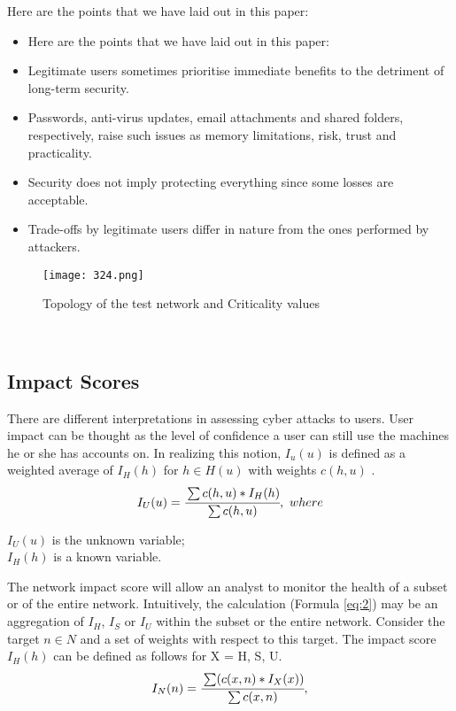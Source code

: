 \documentclass{ledger}
\begin{document}
Here are the points that we have laid out in this paper:
\begin{itemize}
    \item Here are the points that we have laid out in this paper:
    \item Legitimate users sometimes prioritise immediate benefits to the detriment of long-term security. 
    \item Passwords, anti-virus updates, email attachments and shared folders, respectively, raise such issues as memory limitations, risk, trust and practicality. 
    \item Security does not imply protecting everything since some losses are acceptable.  
    \item Trade-offs by legitimate users differ in nature from the ones performed by attackers. 
\end{itemize}
    


\begin{figure}[H]
    \centering
    \texttt{[image: 324.png]}
    \caption{Topology of the test network and Criticality values}
    \label{fig2:enter-label}
\end{figure}
\


\subsection{Impact Scores}
There are different interpretations in assessing cyber attacks to users. User impact can be thought as the level of confidence a user can still use the machines he or she has accounts on. In realizing this notion, $I_u(u)$  is defined as a weighted average of $I_H(h)$ for $h \in H(u)$  with weights $c(h, u)$ .
\begin{equation}
\label{eq:1}
   I_U(u)=\cfrac{\sum c(h, u)*I_H(h)}{\sum c(h,u)},\ where
\end{equation}

$I_U(u)$ is the unknown variable;\\
$I_H(h)$ is a known variable.

The network impact score will allow an analyst to monitor the health of a subset or of the entire network. Intuitively, the calculation (Formula \ref{eq:2}) may be an aggregation of $I_H$, $I_S$ or $I_U$  within the subset or the entire network. Consider the target $n\in N$ and a set of weights with respect to this target. The impact score $I_H(h)$ can be defined as follows for X = H, S, U.
\begin{equation}
\label{eq:2}
    I_N(n)=\cfrac{\sum (c(x, n)*I_X(x))}{\sum c(x,n)},
\end{equation}
\end{document}
